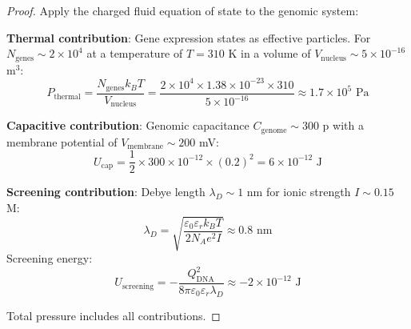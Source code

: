 \documentclass[11pt,a4paper]{article}
\theoremstyle{remark}
\begin{document}
\begin{proof}
Apply the charged fluid equation of state to the genomic system:

\textbf{Thermal contribution}: Gene expression states as effective particles. For $N_{\text{genes}} \sim 2 \times 10^4$ at a temperature of $T = 310$ K in a volume of $V_{\text{nucleus}} \sim 5 \times 10^{-16}$ m$^3$:
\begin{equation}
P_{\text{thermal}} = \frac{N_{\text{genes}}k_BT}{V_{\text{nucleus}}} = \frac{2 \times 10^4 \times 1.38 \times 10^{-23} \times 310}{5 \times 10^{-16}} \approx 1.7 \times 10^5 \text{ Pa}
\end{equation}

\textbf{Capacitive contribution}: Genomic capacitance $C_{\text{genome}} \sim 300$ p with a membrane potential of $V_{\text{membrane}} \sim 200$ mV:
\begin{equation}
U_{\text{cap}} = \frac{1}{2} \times 300 \times 10^{-12} \times (0.2)^2 = 6 \times 10^{-12} \text{ J}
\end{equation}

\textbf{Screening contribution}: Debye length $\lambda_D \sim 1$ nm for ionic strength $I \sim 0.15$ M:
\begin{equation}
\lambda_D = \sqrt{\frac{\varepsilon_0\varepsilon_r k_BT}{2N_A e^2 I}} \approx 0.8 \text{ nm}
\end{equation}
Screening energy:
\begin{equation}
U_{\text{screening}} = -\frac{Q_{\text{DNA}}^2}{8\pi\varepsilon_0\varepsilon_r\lambda_D} \approx -2 \times 10^{-12} \text{ J}
\end{equation}

Total pressure includes all contributions.
\end{proof}
\end{document}
